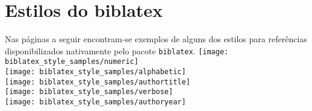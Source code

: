 \chapter{Estilos do biblatex} \label{ape:estilo_biblatex}
Nas páginas a seguir encontram-se exemplos de alguns dos estilos para
referências disponibilizados nativamente pelo pacote \lstinline+biblatex+.
\newpage
\texttt{[image: biblatex\_style\_samples/numeric]} \\
\texttt{[image: biblatex\_style\_samples/alphabetic]} \\
\texttt{[image: biblatex\_style\_samples/authortitle]} \\
\texttt{[image: biblatex\_style\_samples/verbose]} \\
\texttt{[image: biblatex\_style\_samples/authoryear]}